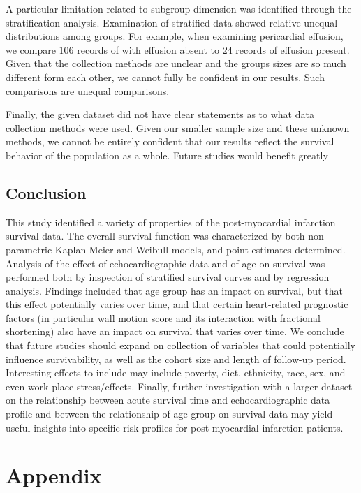 \documentclass[
]{article}
\begin{document}
A particular limitation related to subgroup dimension was identified
through the stratification analysis. Examination of stratified data
showed relative unequal distributions among groups. For example, when
examining pericardial effusion, we compare 106 records of with effusion
absent to 24 records of effusion present. Given that the collection
methods are unclear and the groups sizes are so much different form each
other, we cannot fully be confident in our results. Such comparisons are
unequal comparisons.

Finally, the given dataset did not have clear statements as to what data
collection methods were used. Given our smaller sample size and these
unknown methods, we cannot be entirely confident that our results
reflect the survival behavior of the population as a whole. Future
studies would benefit greatly

\hypertarget{conclusion}{%
\subsection{Conclusion}\label{conclusion}}

This study identified a variety of properties of the post-myocardial
infarction survival data. The overall survival function was
characterized by both non-parametric Kaplan-Meier and Weibull models,
and point estimates determined. Analysis of the effect of
echocardiographic data and of age on survival was performed both by
inspection of stratified survival curves and by regression analysis.
Findings included that age group has an impact on survival, but that
this effect potentially varies over time, and that certain heart-related
prognostic factors (in particular wall motion score and its interaction
with fractional shortening) also have an impact on survival that varies
over time. We conclude that future studies should expand on collection
of variables that could potentially influence survivability, as well as
the cohort size and length of follow-up period. Interesting effects to
include may include poverty, diet, ethnicity, race, sex, and even work
place stress/effects. Finally, further investigation with a larger
dataset on the relationship between acute survival time and
echocardiographic data profile and between the relationship of age group
on survival data may yield useful insights into specific risk profiles
for post-myocardial infarction patients.

\newpage

\hypertarget{appendix}{%
\section{Appendix}\label{appendix}}
\end{document}

